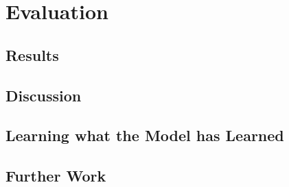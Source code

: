 \section{Evaluation}

\subsection{Results}

\subsection{Discussion}

\subsection{Learning what the Model has Learned}

\subsection{Further Work}
